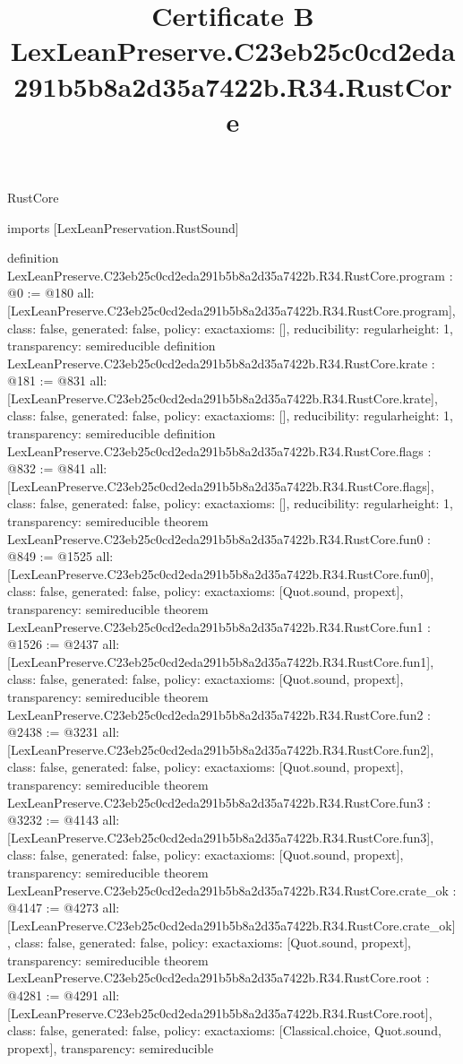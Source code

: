 \begin{lexlean}{RustCore}
\title{Certificate B LexLeanPreserve.C23eb25c0cd2eda291b5b8a2d35a7422b.R34.RustCore}
\begin{coremodule}
imports [LexLeanPreservation.RustSound]

definition LexLeanPreserve.C23eb25c0cd2eda291b5b8a2d35a7422b.R34.RustCore.program : @0 := @180 {
  all: [LexLeanPreserve.C23eb25c0cd2eda291b5b8a2d35a7422b.R34.RustCore.program],
  class: false,
  generated: false,
  policy: exact{axioms: []},
  reducibility: regular{height: 1},
  transparency: semireducible
}
definition LexLeanPreserve.C23eb25c0cd2eda291b5b8a2d35a7422b.R34.RustCore.krate : @181 := @831 {
  all: [LexLeanPreserve.C23eb25c0cd2eda291b5b8a2d35a7422b.R34.RustCore.krate],
  class: false,
  generated: false,
  policy: exact{axioms: []},
  reducibility: regular{height: 1},
  transparency: semireducible
}
definition LexLeanPreserve.C23eb25c0cd2eda291b5b8a2d35a7422b.R34.RustCore.flags : @832 := @841 {
  all: [LexLeanPreserve.C23eb25c0cd2eda291b5b8a2d35a7422b.R34.RustCore.flags],
  class: false,
  generated: false,
  policy: exact{axioms: []},
  reducibility: regular{height: 1},
  transparency: semireducible
}
theorem LexLeanPreserve.C23eb25c0cd2eda291b5b8a2d35a7422b.R34.RustCore.fun0 : @849 := @1525 {
  all: [LexLeanPreserve.C23eb25c0cd2eda291b5b8a2d35a7422b.R34.RustCore.fun0],
  class: false,
  generated: false,
  policy: exact{axioms: [Quot.sound, propext]},
  transparency: semireducible
}
theorem LexLeanPreserve.C23eb25c0cd2eda291b5b8a2d35a7422b.R34.RustCore.fun1 : @1526 := @2437 {
  all: [LexLeanPreserve.C23eb25c0cd2eda291b5b8a2d35a7422b.R34.RustCore.fun1],
  class: false,
  generated: false,
  policy: exact{axioms: [Quot.sound, propext]},
  transparency: semireducible
}
theorem LexLeanPreserve.C23eb25c0cd2eda291b5b8a2d35a7422b.R34.RustCore.fun2 : @2438 := @3231 {
  all: [LexLeanPreserve.C23eb25c0cd2eda291b5b8a2d35a7422b.R34.RustCore.fun2],
  class: false,
  generated: false,
  policy: exact{axioms: [Quot.sound, propext]},
  transparency: semireducible
}
theorem LexLeanPreserve.C23eb25c0cd2eda291b5b8a2d35a7422b.R34.RustCore.fun3 : @3232 := @4143 {
  all: [LexLeanPreserve.C23eb25c0cd2eda291b5b8a2d35a7422b.R34.RustCore.fun3],
  class: false,
  generated: false,
  policy: exact{axioms: [Quot.sound, propext]},
  transparency: semireducible
}
theorem LexLeanPreserve.C23eb25c0cd2eda291b5b8a2d35a7422b.R34.RustCore.crate_ok : @4147 := @4273 {
  all: [LexLeanPreserve.C23eb25c0cd2eda291b5b8a2d35a7422b.R34.RustCore.crate_ok],
  class: false,
  generated: false,
  policy: exact{axioms: [Quot.sound, propext]},
  transparency: semireducible
}
theorem LexLeanPreserve.C23eb25c0cd2eda291b5b8a2d35a7422b.R34.RustCore.root : @4281 := @4291 {
  all: [LexLeanPreserve.C23eb25c0cd2eda291b5b8a2d35a7422b.R34.RustCore.root],
  class: false,
  generated: false,
  policy: exact{axioms: [Classical.choice, Quot.sound, propext]},
  transparency: semireducible
}


\end{coremodule}
\end{lexlean}
